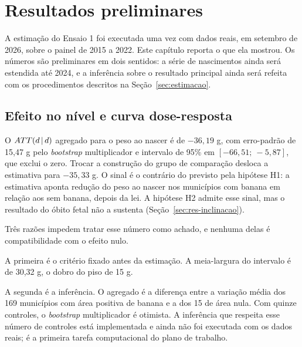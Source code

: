%

\chapter{Resultados preliminares}
\label{cap:resultados}

A estimação do Ensaio 1 foi executada uma vez com dados reais, em setembro de
2026, sobre o painel de 2015 a 2022. Este capítulo reporta o que ela mostrou.
Os números são preliminares em dois sentidos: a série de nascimentos ainda será
estendida até 2024, e a inferência sobre o resultado principal ainda será
refeita com os procedimentos descritos na Seção~\ref{sec:estimacao}.

\section{Efeito no nível e curva dose-resposta}
\label{sec:res-nivel}

O $ATT(d\,|\,d)$ agregado para o peso ao nascer é de $-36{,}19$ g, com erro-padrão de
15,47 g pelo \emph{bootstrap} multiplicador e intervalo de 95\% em
$[-66{,}51;\ -5{,}87]$, que exclui o zero. Trocar a construção do grupo de
comparação desloca a estimativa para $-35{,}33$ g. O sinal é o contrário do
previsto pela hipótese H1: a estimativa aponta redução do peso ao nascer nos
municípios com banana em relação aos sem banana, depois da lei. A hipótese H2
admite esse sinal, mas o resultado do óbito fetal não a sustenta
(Seção~\ref{sec:res-inclinacao}).

Três razões impedem tratar esse número como achado, e nenhuma delas é
compatibilidade com o efeito nulo.

A primeira é o critério fixado antes da estimação. A meia-largura do intervalo
é de 30,32 g, o dobro do piso de 15 g.

A segunda é a inferência. O agregado é a diferença entre a variação média dos
169 municípios com área positiva de banana e a dos 15 de área nula. Com quinze
controles, o \emph{bootstrap} multiplicador é otimista. A inferência que
respeita esse número de controles está implementada e ainda não foi executada
com os dados reais; é a primeira tarefa computacional do plano de trabalho.

